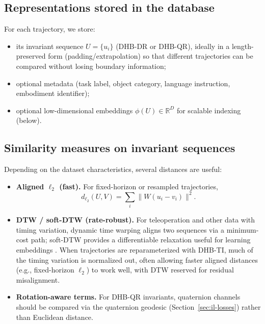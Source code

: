 \documentclass[11pt]{article}
\begin{document}
\subsection{Representations stored in the database}
For each trajectory, we store:
\begin{itemize}
  \item its invariant sequence $U=\{u_i\}$ (DHB-DR or DHB-QR), ideally in a length-preserved form (padding/extrapolation) so that different trajectories can be compared without losing boundary information;
  \item optional metadata (task label, object category, language instruction, embodiment identifier);
  \item optional low-dimensional embeddings $\phi(U)\in\mathbb{R}^D$ for scalable indexing (below).
\end{itemize}

\subsection{Similarity measures on invariant sequences}
Depending on the dataset characteristics, several distances are useful:
\begin{itemize}
  \item \textbf{Aligned $\ell_2$ (fast).} For fixed-horizon or resampled trajectories,
    \begin{equation}
      d_{\ell_2}(U,V) = \sum_i \lVert W (u_i - v_i)\rVert^2.
    \end{equation}

  \item \textbf{DTW / soft-DTW (rate-robust).} For teleoperation and other data with timing variation, dynamic time warping aligns two sequences via a minimum-cost path; soft-DTW provides a differentiable relaxation useful for learning embeddings \cite{cuturi2017softdtw}. When trajectories are reparameterized with DHB-TI, much of the timing variation is normalized out, often allowing faster aligned distances (e.g., fixed-horizon $\ell_2$) to work well, with DTW reserved for residual misalignment.

  \item \textbf{Rotation-aware terms.} For DHB-QR invariants, quaternion channels should be compared via the quaternion geodesic (Section~\ref{sec:il-losses}) rather than Euclidean distance.
\end{itemize}
\end{document}
